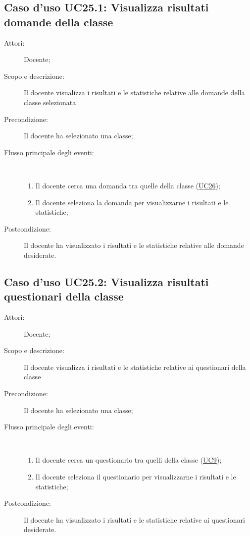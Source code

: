 \subsection{Caso d'uso UC25.1: Visualizza risultati domande della classe}\begin{description}
	\item[Attori:] Docente;
	\item[Scopo e descrizione:] Il docente visualizza i risultati e le statistiche relative alle domande della classe selezionata
	\item[Precondizione:] Il docente ha selezionato una classe;
	
	\item[Flusso principale degli eventi:] \ 
	\begin{enumerate}
		\item Il docente cerca una domanda tra quelle della classe (\hyperlink{UC26}{UC26});
		\item Il docente seleziona la domanda per visualizzarne i risultati e le statistiche;
		
	\end{enumerate}
	\item[Postcondizione:] Il docente ha visualizzato i risultati e le statistiche relative alle domande desiderate.
\end{description}
\hypertarget{UC25.2}{}
\subsection{Caso d'uso UC25.2: Visualizza risultati questionari della classe}\begin{description}
	\item[Attori:] Docente;
	\item[Scopo e descrizione:] Il docente visualizza i risultati e le statistiche relative ai questionari della classe
	\item[Precondizione:] Il docente ha selezionato una classe;
	
	\item[Flusso principale degli eventi:] \ 
	\begin{enumerate}
		\item Il docente cerca un questionario tra quelli della classe (\hyperlink{UC9}{UC9});
		\item Il docente seleziona il questionario per visualizzarne i risultati e le statistiche;
		
	\end{enumerate}
	\item[Postcondizione:] Il docente ha visualizzato i risultati e le statistiche relative ai questionari desiderate.
\end{description}
\hypertarget{UC25.3}{}
